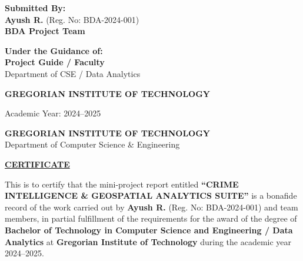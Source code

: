 \documentclass[12pt,a4paper]{report}
\begin{document}
\begin{center}
    \vspace{1.2cm}
    \begin{minipage}{0.45\textwidth}
        \begin{flushleft}
            \fontsize{11}{14}\selectfont
            \textbf{Submitted By:}\\[2pt]
            \textbf{Ayush R.} (Reg. No: BDA-2024-001)\\[2pt]
            \textbf{BDA Project Team}
        \end{flushleft}
    \end{minipage}
    \hfill
    \begin{minipage}{0.45\textwidth}
        \begin{flushright}
            \fontsize{11}{14}\selectfont
            \textbf{Under the Guidance of:}\\[2pt]
            \textbf{Project Guide / Faculty}\\[2pt]
            Department of CSE / Data Analytics
        \end{flushright}
    \end{minipage}

    \vfill
    {\fontsize{12}{15}\selectfont\bfseries GREGORIAN INSTITUTE OF TECHNOLOGY\par}
    {\fontsize{11}{14}\selectfont Academic Year: 2024--2025\par}
\end{center}
\newpage

\thispagestyle{frontmatterstyle}
\begin{center}
    \textcolor{collegeblue}{\fontsize{14}{18}\selectfont\bfseries GREGORIAN INSTITUTE OF TECHNOLOGY}\\[2pt]
    \textcolor{collegeblue}{\fontsize{11}{14}\selectfont Department of Computer Science \& Engineering}\\[1pt]
    \textcolor{collegeblue}{\fontsize{9}{12}}\par
    \vspace{0.8cm}
    {\fontsize{14}{18}\selectfont\bfseries\underline{CERTIFICATE}\par}
\end{center}

\vspace{0.8cm}
\noindent This is to certify that the mini-project report entitled \textbf{“CRIME INTELLIGENCE \& GEOSPATIAL ANALYTICS SUITE”} is a bonafide record of the work carried out by \textbf{Ayush R.} (Reg. No: BDA-2024-001) and team members, in partial fulfillment of the requirements for the award of the degree of \textbf{Bachelor of Technology in Computer Science and Engineering / Data Analytics} at \textbf{Gregorian Institute of Technology} during the academic year 2024--2025.
\end{document}
